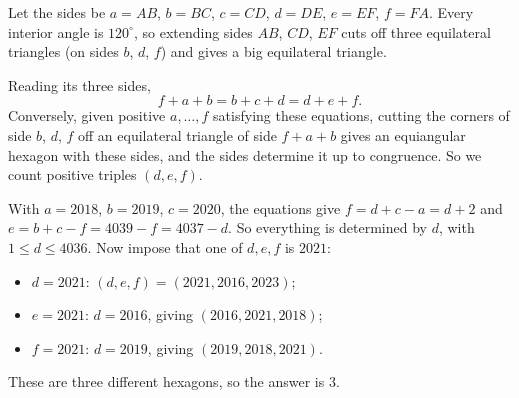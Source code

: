 Let the sides be $a=AB$, $b=BC$, $c=CD$, $d=DE$, $e=EF$, $f=FA$. Every interior angle is $120^\circ$, so extending sides $AB$, $CD$, $EF$ cuts off three equilateral triangles (on sides $b$, $d$, $f$) and gives a big equilateral triangle.


Reading its three sides,
\[
f+a+b=b+c+d=d+e+f .
\]
Conversely, given positive $a,\dots,f$ satisfying these equations, cutting the corners of side $b$, $d$, $f$ off an equilateral triangle of side $f+a+b$ gives an equiangular hexagon with these sides, and the sides determine it up to congruence. So we count positive triples $(d,e,f)$.

With $a=2018$, $b=2019$, $c=2020$, the equations give $f=d+c-a=d+2$ and $e=b+c-f=4039-f=4037-d$. So everything is determined by $d$, with $1\le d\le4036$. Now impose that one of $d,e,f$ is $2021$:
\begin{itemize}
\item $d=2021$: $(d,e,f)=(2021,2016,2023)$;
\item $e=2021$: $d=2016$, giving $(2016,2021,2018)$;
\item $f=2021$: $d=2019$, giving $(2019,2018,2021)$.
\end{itemize}
These are three different hexagons, so the answer is $\boxed{3}$.
